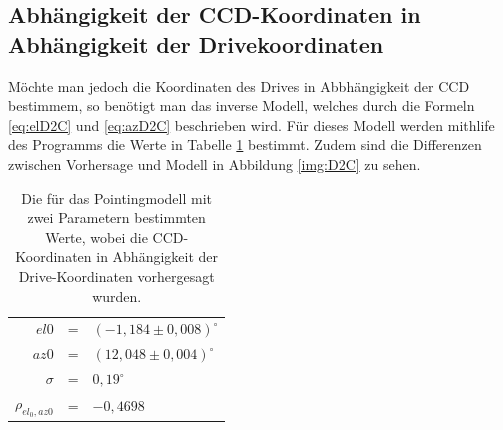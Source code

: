 
\subsection{Abhängigkeit der CCD-Koordinaten in Abhängigkeit der Drivekoordinaten}
Möchte man jedoch die Koordinaten des Drives in Abbhängigkeit der CCD bestimmem, so benötigt man das inverse Modell, welches durch die Formeln \ref{eq:elD2C} und \ref{eq:azD2C} beschrieben wird. Für dieses Modell werden mithlife des Programms die Werte in Tabelle \ref{tab:D2C} bestimmt. Zudem sind die Differenzen zwischen Vorhersage und Modell in Abbildung  \ref{img:D2C} zu sehen.
\begin{table}[htbp]
\centering
\begin{tabular}{rcl}
\toprule
$el0$ &=& $(-1,184\pm0,008)^{\circ}$\\
$az0$ &=& $(12,048\pm0,004)^{\circ}$\\
$\sigma$ &=& $0,19^{\circ}$\\
$\rho_{el_0,az0}$ &=& $-0,4698$\\
\bottomrule
\end{tabular}
\label{tab:D2C}
\caption{Die für das Pointingmodell mit zwei Parametern bestimmten Werte, wobei die CCD-Koordinaten in Abhängigkeit der Drive-Koordinaten vorhergesagt wurden.}
\end{table}


